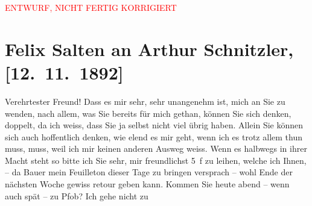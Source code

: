 
\begin{center}
            \textcolor{red}{ENTWURF, NICHT FERTIG KORRIGIERT}
                      \end{center}
            
         
         \renewcommand{\erwaehntePersonen}{Personen: Julius Bauer, Paul Horn}
         \renewcommand{\erwaehnteOrte}{Orte: Café Pfob, Café Union, Riedhof, Volkstheater, Wien}
         \renewcommand{\erwaehnteWerke}{Werke: ?? [Feuilleton], Musotte, Tagebuch}
               \section[Felix Salten an Arthur Schnitzler, {[}12. 11. 1892{]}]{ Felix Salten an Arthur Schnitzler, {[}12. 11. 1892{]}}\nopagebreak{}\rehead{ }\begin{ledgroupsized}[t]{13cm}\normalsize\beginnumbering \toendnotes[C]{\smallbreak\pagebreak[2]} 
\toendnotes[C]{\smallbreak}\pstart
           \noindent{}{\pb}Verehrtester Freund! Dass es mir sehr, sehr unangenehm ist, mich an
               Sie zu wenden, nach allem, was Sie bereits für mich gethan, können Sie sich denken,
               doppelt, da ich weiss, dass Sie ja selbst nicht viel übrig haben. Allein Sie können
               sich auch hoffentlich denken, wie elend es mir geht, wenn ich es trotz allem thun
               muss, muss, weil ich mir keinen anderen Ausweg weiss. Wenn es halbwegs in ihrer Macht steht so bitte ich Sie sehr, mir
               freundlichst 5 f zu leihen, welche ich {\pb}Ihnen, – da Bauer mein Feuilleton dieser Tage zu
               bringen versprach – wohl Ende der nächsten Woche \introOben{}gewiss\introOben{} retour geben kann. \pend
           \pstart
           Kommen Sie heute abend – wenn auch spät – zu Pfob? Ich
               gehe nicht zu \label{K_L03117-2v}
\end{ledgroupsized}
